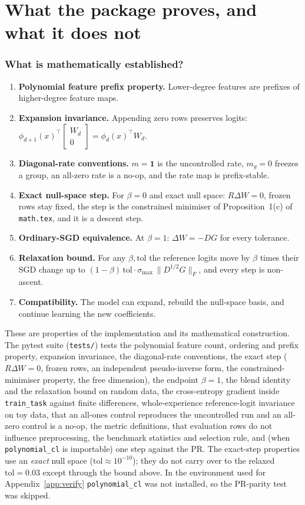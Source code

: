 \documentclass[11pt,a4paper]{article}
\newcommand{\code}[1]{\texttt{#1}}
\begin{document}
\part{What the package proves, and what it does not}

\section{What is mathematically established?}

\begin{enumerate}
\item \textbf{Polynomial feature prefix property.} Lower-degree features are prefixes of higher-degree feature maps.
\item \textbf{Expansion invariance.} Appending zero rows preserves logits: $\phi_{d+1}(x)^\top\begin{bmatrix}W_d\\0\end{bmatrix}=\phi_d(x)^\top W_d$.
\item \textbf{Diagonal-rate conventions.} $m=\mathbf 1$ is the uncontrolled rate, $m_g=0$ freezes a group, an all-zero rate is a no-op, and the rate map is prefix-stable.
\item \textbf{Exact null-space step.} For $\beta=0$ and exact null space: $R\Delta W=0$, frozen rows stay fixed, the step is the constrained minimiser of Proposition~1(c) of \code{math.tex}, and it is a descent step.
\item \textbf{Ordinary-SGD equivalence.} At $\beta=1$: $\Delta W=-DG$ for every tolerance.
\item \textbf{Relaxation bound.} For any $\beta,\text{tol}$ the reference logits move by $\beta$ times their SGD change up to $(1-\beta)\,\text{tol}\cdot\sigma_{\max}\,\|D^{1/2}G\|_F$, and every step is non-ascent.
\item \textbf{Compatibility.} The model can expand, rebuild the null-space basis, and continue learning the new coefficients.
\end{enumerate}
These are properties of the implementation and its mathematical construction. The pytest suite (\code{tests/}) tests the polynomial feature count, ordering and prefix property, expansion invariance, the diagonal-rate conventions, the exact step ($R\Delta W=0$, frozen rows, an independent pseudo-inverse form, the constrained-minimiser property, the free dimension), the endpoint $\beta=1$, the blend identity and the relaxation bound on random data, the cross-entropy gradient inside \code{train\_task} against finite differences, whole-experience reference-logit invariance on toy data, that an all-ones control reproduces the uncontrolled run and an all-zero control is a no-op, the metric definitions, that evaluation rows do not influence preprocessing, the benchmark statistics and selection rule, and (when \code{polynomial\_cl} is importable) one step against the PR. The exact-step properties use an \emph{exact} null space ($\text{tol}\approx10^{-10}$); they do not carry over to the relaxed $\text{tol}=0.03$ except through the bound above. In the environment used for Appendix~\ref{app:verify} \code{polynomial\_cl} was not installed, so the PR-parity test was skipped.
\end{document}
